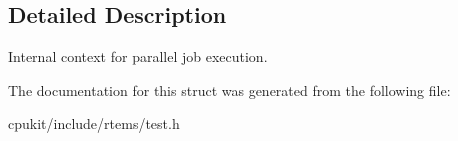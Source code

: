 \subsection{Detailed Description}
Internal context for parallel job execution. 

The documentation for this struct was generated from the following file\+:\begin{DoxyCompactItemize}
\item 
cpukit/include/rtems/test.\+h\end{DoxyCompactItemize}

